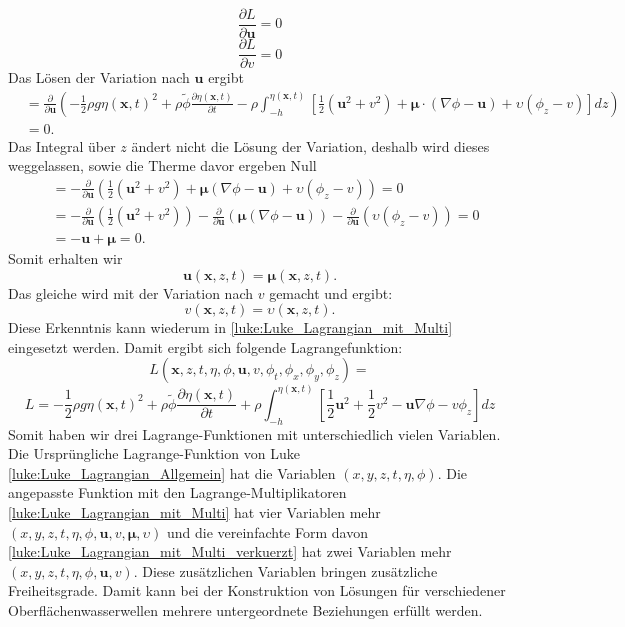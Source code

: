 \[
\frac{\partial L}{\partial \bm{u}} = 0
\]
\[
\frac{\partial L}{\partial v} = 0
\]
Das Lösen der Variation nach $\bm{u}$ ergibt
\begin{align*}
	&= \frac{\partial \mathscr{}}{\partial \bm{u}}\left( -\frac{1}{2} \rho g \eta(\bm{x},t)^2 + \rho\tilde{\phi} \frac{\partial\eta(\bm{x},t)}{\partial t} -\rho \int_{-h}^{\eta(\bm{x},t)} \left[ \frac{1}{2} (\bm{u}^2 + v^2) + \bm{\mu} \cdot (\nabla\phi - \bm{u}) + \upsilon \left(\phi_z - v\right) \right] dz\right)
	\\
	&= 0.
\end{align*}
Das Integral über $z$ ändert nicht die Lösung der Variation, deshalb wird dieses weggelassen, sowie die Therme davor ergeben Null
\begin{align*}
	&= -\frac{\partial}{\partial \bm{u}} \left(\frac{1}{2} (\bm{u}^2 + v^2) + \bm{\mu} (\nabla\phi - \bm{u}) + \upsilon \left(\phi_z - v\right) \right) = 0
	\\
	&= -\frac{\partial}{\partial \bm{u}} \left( \frac{1}{2} (\bm{u}^2 + v^2) \right)  -\frac{\partial}{\partial \bm{u}} \left( \bm{\mu} (\nabla\phi - \bm{u}) \right)  -\frac{\partial}{\partial \bm{u}} \left( \upsilon \left(\phi_z - v\right) \right) = 0
	\\
	&=
	-\bm{u}
	+\bm{\mu}
	= 0.
\end{align*}
Somit erhalten wir
\begin{equation}
	\bm{u}(\bm{x},z,t) = \bm{\mu}(\bm{x},z,t).
\end{equation}
Das gleiche wird mit der Variation nach $v$ gemacht und ergibt:
\begin{equation}
	v(\bm{x},z,t) = \upsilon(\bm{x},z,t).
\end{equation}
Diese Erkenntnis kann wiederum in \eqref{luke:Luke_Lagrangian_mit_Multi} eingesetzt werden.
Damit ergibt sich folgende Lagrangefunktion:
\[
L(\bm{x},z,t,\eta,\phi,\bm{u}, v,\phi_t,\phi_x, \phi_y, \phi_z)
=
\]
\begin{equation}
	L
	=
	-
	\frac{1}{2}\rho g \eta(\bm{x},t)^2
	+
	\rho\tilde{\phi} \frac{\partial\eta(\bm{x},t)}{\partial t}
	+
	\rho\int_{-h}^{\eta(\bm{x},t)} \left[ \frac{1}{2} \bm{u}^2 + \frac{1}{2} v^2 - \bm{u} \nabla \phi - v \phi_z \right] dz 
	\label{luke:Luke_Lagrangian_mit_Multi_verkuerzt}
\end{equation}
Somit haben wir drei Lagrange-Funktionen mit unterschiedlich vielen Variablen.
Die Ursprüngliche Lagrange-Funktion von Luke \eqref{luke:Luke_Lagrangian_Allgemein} hat die Variablen $(x,y,z,t,\eta,\phi)$.
Die angepasste Funktion mit den Lagrange-Multiplikatoren \eqref{luke:Luke_Lagrangian_mit_Multi} hat vier Variablen mehr $(x,y,z,t,\eta,\phi,\bm{u},v,\bm{\mu},\upsilon)$ und die vereinfachte Form davon \eqref{luke:Luke_Lagrangian_mit_Multi_verkuerzt} hat zwei Variablen mehr $(x,y,z,t,\eta,\phi,\bm{u},v)$.
Diese zusätzlichen Variablen bringen zusätzliche Freiheitsgrade.
Damit kann bei der Konstruktion von Lösungen für verschiedener Oberflächenwasserwellen mehrere untergeordnete Beziehungen erfüllt werden.

